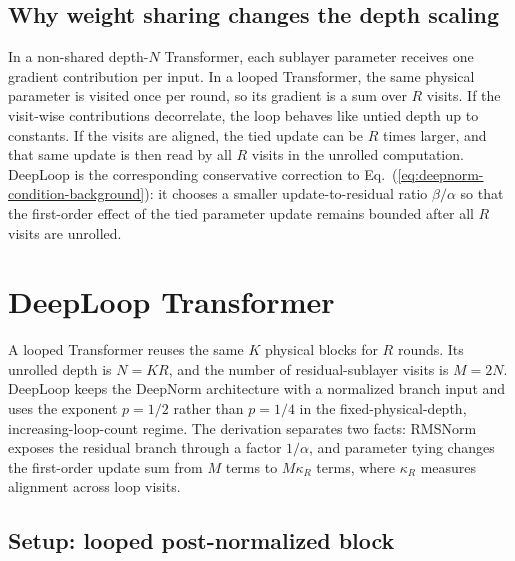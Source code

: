 \documentclass[11pt]{airesearch}
\begin{document}
\subsection{Why weight sharing changes the depth scaling}
\label{sec:background:sharing}

In a non-shared depth-$N$ Transformer, each sublayer parameter receives
one gradient contribution per input. In a looped Transformer, the same
physical parameter is visited once per round, so its gradient is a sum
over $R$ visits. If the visit-wise contributions decorrelate, the loop
behaves like untied depth up to constants. If the visits are aligned,
the tied update can be $R$ times larger, and that same update is then
read by all $R$ visits in the unrolled computation. DeepLoop is the
corresponding conservative correction to Eq.~(\ref{eq:deepnorm-condition-background}): it chooses a smaller
update-to-residual ratio $\beta/\alpha$ so that the first-order effect of the tied parameter update remains bounded after all $R$ visits are unrolled.

\section{DeepLoop Transformer}
\label{sec:method}

A looped Transformer reuses the same $K$ physical blocks for $R$ rounds. Its
unrolled depth is $N=KR$, and the number of residual-sublayer visits is
$M=2N$. DeepLoop keeps the DeepNorm architecture with a normalized branch
input and uses the exponent
$p=1/2$ rather than $p=1/4$ in the fixed-physical-depth, increasing-loop-count
regime. The derivation separates two facts: RMSNorm exposes the residual branch
through a factor $1/\alpha$, and parameter tying changes the first-order update
sum from $M$ terms to $M\kappa_R$ terms, where $\kappa_R$ measures alignment
across loop visits.

\subsection{Setup: looped post-normalized block}
\label{sec:method:setup}
\end{document}
